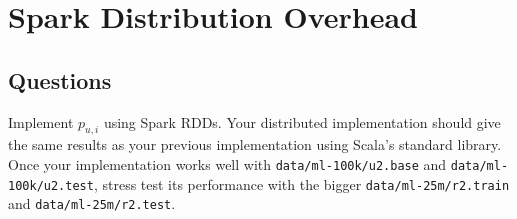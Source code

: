 \documentclass{article}
\begin{document}
\section{Spark Distribution Overhead}

\subsection{Questions}
\label{section:q5}

Implement $p_{u,i}$ using Spark RDDs. Your distributed implementation should give the same results as your previous implementation using Scala's standard library. Once your implementation works well with \texttt{data/ml-100k/u2.base} and \texttt{data/ml-100k/u2.test}, stress test its performance with the bigger \newline \texttt{data/ml-25m/r2.train} and \texttt{data/ml-25m/r2.test}. 
\end{document}
